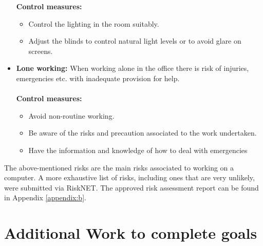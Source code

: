 \documentclass[a4paper,12pt]{report}
\begin{document}
\begin{itemize}
	\textbf{Control measures:}
	\begin{itemize}
		\item Control the lighting in the room suitably.
		\item Adjust the blinds to control natural light levels or to avoid glare on screens.
	\end{itemize}
	\item \textbf{Lone working:} When working alone in the office there is risk of injuries, emergencies etc. with inadequate provision for help.\\ \\
	\textbf{Control measures:}
	\begin{itemize}
		\item Avoid non-routine working.
		\item Be aware of the risks and precaution associated to the work undertaken.
		\item Have the information and knowledge of how to deal with emergencies
	\end{itemize}
\end{itemize}

The above-mentioned risks are the main risks associated to working on a computer. A more exhaustive list of risks, including ones that are very unlikely, were submitted via RiskNET. The approved risk assessment report can be found in Appendix \ref{appendix:b}.	


\section{Additional Work to complete goals}
\end{document}
